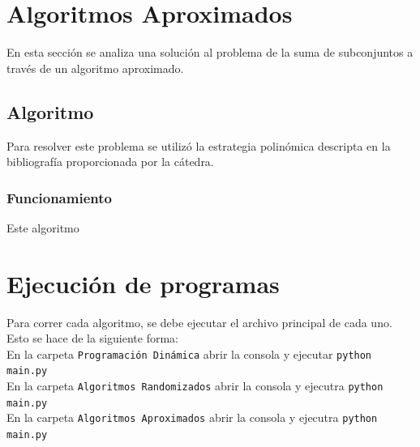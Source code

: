 \documentclass[a4paper, 10pt]{article}
\def\code#1{\texttt{#1}}
\newcommand\tab[1][0.5cm]{\hspace*{#1}}
\begin{document}
    \section{Algoritmos Aproximados}
        \tab En esta sección se analiza una solución al problema de la suma de subconjuntos
        a través de un algoritmo aproximado.
        \subsection{Algoritmo}
            \tab Para resolver este problema se utilizó la estrategia polinómica descripta en
            la bibliografía proporcionada por la cátedra.
            \subsubsection{Funcionamiento}
                \tab Este algoritmo %
    \newpage

    \section{Ejecución de programas}
    \tab Para correr cada algoritmo, se debe ejecutar el archivo principal de cada uno.
    Esto se hace de la siguiente forma: \\
    \tab\tab En la carpeta \code{Programación Dinámica} abrir la consola y ejecutar \code{python main.py} \\
    \tab\tab En la carpeta \code{Algoritmos Randomizados} abrir la consola y ejecutra \code{python main.py} \\
    \tab\tab En la carpeta \code{Algoritmos Aproximados} abrir la consola y ejecutra \code{python main.py} \\

\end{document}
